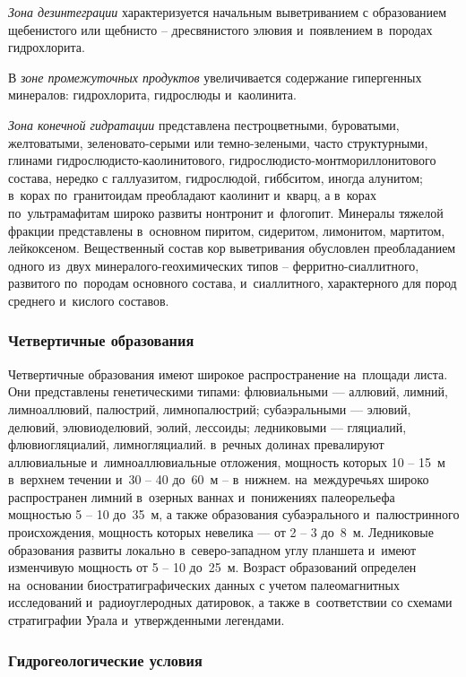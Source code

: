 \textit{Зона дезинтеграции} характеризуется начальным выветриванием с образованием щебенистого или щебнисто -- дресвянистого элювия и~появлением в~породах гидрохлорита. 

В \textit{зоне промежуточных продуктов} увеличивается содержание гипергенных минералов: гидрохлорита, гидрослюды и~каолинита. 

\textit{Зона конечной гидратации} представлена пестроцветными, буроватыми, желтоватыми, зеленовато-серыми или темно-зелеными, часто структурными, глинами гидро\-слюдисто-каолинитового, гидрослюдисто-монтмориллонитового состава, нередко с галлуазитом, гидрослюдой, гиббситом, иногда алунитом; в~корах по~гранитоидам преобладают каолинит и~кварц, а в~корах по~ультрамафитам широко развиты нонтронит и~флогопит. Минералы тяжелой фракции представлены в~основном пиритом, сидеритом, лимонитом, мартитом, лейкоксеном. Вещественный состав кор выветривания обусловлен преобладанием одного из~двух минералого-геохимических типов  --  ферритно-сиаллитного, развитого по~породам основного состава, и~сиаллитного, характерного для пород среднего и~кислого составов.

\subsubsection*{Четвертичные образования}
Четвертичные образования имеют широкое распространение на~площади листа. Они представлены генетическими типами: флювиальными --- аллювий, лимний, лимноаллювий, палюстрий, лимнопалюстрий; субаэральными --- элювий, делювий, элювиоделювий, эолий, лессоиды; ледниковыми --- гляциалий, флювиогляциалий, лимногляциалий. в~речных долинах превалируют аллювиальные и~лимноаллювиальные отложения, мощность которых 10 -- 15~м в~верхнем течении и~30 -- 40 до~60~м -- в~нижнем. на~междуречьях широко распространен лимний в~озерных ваннах и~понижениях палеорельефа мощностью 5 -- 10 до~35~м, а также образования субаэрального и~палюстринного происхождения, мощность которых невелика --- 
от 2 -- 3 до~8~м. Ледниковые образования развиты локально в~северо-западном углу планшета и~имеют изменчивую мощность от 5 -- 10 до~25~м.
Возраст образований определен на~основании биостратиграфических данных с учетом палеомагнитных исследований и~радиоуглеродных датировок, а также в~соответствии со схемами стратиграфии Урала и~утвержденными легендами.

\subsubsection{Гидрогеологические условия}
%
\hydrogeology

